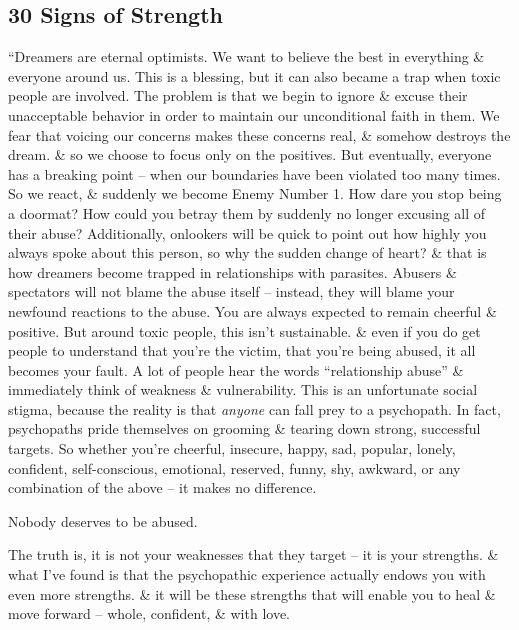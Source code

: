 \documentclass{article}
\numberwithin{equation}{section}
\begin{document}
\subsection{30 Signs of Strength}
``Dreamers are eternal optimists. We want to believe the best in everything \& everyone around us. This is a blessing, but it can also became a trap when toxic people are involved. The problem is that we begin to ignore \& excuse their unacceptable behavior in order to maintain our unconditional faith in them. We fear that voicing our concerns makes these concerns real, \& somehow destroys the dream. \& so we choose to focus only on the positives. But eventually, everyone has a breaking point -- when our boundaries have been violated too many times. So we react, \& suddenly we become Enemy Number 1. How dare you stop being a doormat? How could you betray them by suddenly no longer excusing all of their abuse? Additionally, onlookers will be quick to point out how highly you always spoke about this person, so why the sudden change of heart? \& that is how dreamers become trapped in relationships with parasites. Abusers \& spectators will not blame the abuse itself -- instead, they will blame your newfound reactions to the abuse. You are always expected to remain cheerful \& positive. But around toxic people, this isn't sustainable. \& even if you do get people to understand that you're the victim, that you're being abused, it all becomes your fault. A lot of people hear the words ``relationship abuse'' \& immediately think of weakness \& vulnerability. This is an unfortunate social stigma, because the reality is that \textit{anyone} can fall prey to a psychopath. In fact, psychopaths pride themselves on grooming \& tearing down strong, successful targets. So whether you're cheerful, insecure, happy, sad, popular, lonely, confident, self-conscious, emotional, reserved, funny, shy, awkward, or any combination of the above -- it makes no difference.

Nobody deserves to be abused.

The truth is, it is not your weaknesses that they target -- it is your strengths. \& what I've found is that the psychopathic experience actually endows you with even more strengths. \& it will be these strengths that will enable you to heal \& move forward -- whole, confident, \& with love.
\end{document}
